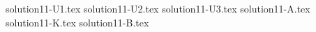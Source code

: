 \documentclass{article}
\begin{document}
{solution11-U1.tex}
{solution11-U2.tex}
{solution11-U3.tex}
{solution11-A.tex}
{solution11-K.tex}
{solution11-B.tex}
\end{document}
